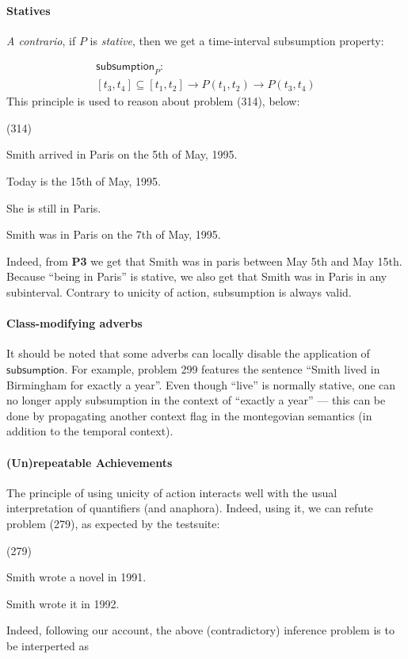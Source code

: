 \documentclass[a4paper,11pt]{article}
\newcommand\hyp{\item[H]}
\newcommand\fracasex[2]{\begin{lingex}\item[(#1)] \begin{subex} #2 \end{subex} \end{lingex} }
\newcommand\constant[1]{\mathsf{#1}}
\begin{document}
\paragraph{Statives}
\textit{A contrario}, if \(P\) is \emph{stative}, then we get a time-interval subsumption property:

\begin{multline*}
\constant {subsumption}_P :\\ [t_3,t_4] ⊆ [t_1,t_2] → P (t_1,t_2) → P (t_3,t_4)
\end{multline*}
This principle is used to reason about problem (314), below:

\fracasex{314}
{\item	Smith arrived in Paris on the 5th of May, 1995.
\item	Today is the 15th of May, 1995.
\item	She is still in Paris.
\hyp 	Smith was in Paris on the 7th of May, 1995.
}

Indeed, from \textbf{P3} we get that Smith was in paris between May
5th and May 15th. Because ``being in Paris'' is stative, we also get that
Smith was in Paris in any subinterval. Contrary to unicity of action,
subsumption is always valid.

\paragraph{Class-modifying adverbs}
It should be noted that some adverbs can locally disable the
application of $\constant {subsumption}$. For example, problem 299
features the sentence ``Smith lived in Birmingham for exactly a
year''.  Even though ``live'' is normally stative, one can no longer
apply subsumption in the context of ``exactly a year'' --- this can be
done by propagating another context flag in the montegovian semantics
(in addition to the temporal context).

\paragraph{(Un)repeatable Achievements}
\label{sec:repeatable-achievements}
The principle of using unicity of action interacts well with the usual
interpretation of quantifiers (and anaphora).  Indeed, using it, we
can refute problem (279), as expected by the testsuite:

\fracasex{279}{
\item	Smith wrote a novel in 1991.
\hyp 	 Smith wrote it in 1992.
}
Indeed, following our account, the above (contradictory) inference problem is to be
interperted as
\end{document}
